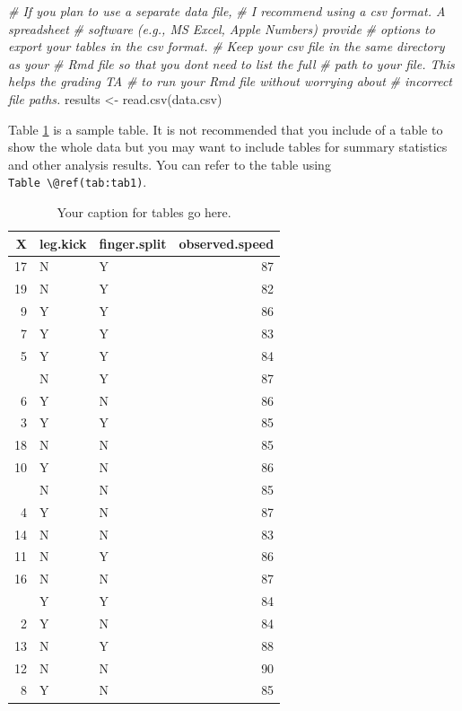 \documentclass[
]{article}
\newenvironment{Shaded}{\begin{snugshade}}{\end{snugshade}}
\newcommand{\CommentTok}[1]{\textcolor[rgb]{0.56,0.35,0.01}{\textit{#1}}}
\newcommand{\FunctionTok}[1]{\textcolor[rgb]{0.00,0.00,0.00}{#1}}
\newcommand{\NormalTok}[1]{#1}
\newcommand{\OtherTok}[1]{\textcolor[rgb]{0.56,0.35,0.01}{#1}}
\newcommand{\StringTok}[1]{\textcolor[rgb]{0.31,0.60,0.02}{#1}}
\begin{document}
\begin{Shaded}
\begin{Highlighting}[]
\CommentTok{\# If you plan to use a separate data file,}
\CommentTok{\# I recommend using a csv format. A spreadsheet}
\CommentTok{\# software (e.g., MS Excel, Apple Numbers) provide}
\CommentTok{\# options to export your tables in the csv format.}
\CommentTok{\# Keep your csv file in the same directory as your}
\CommentTok{\# Rmd file so that you don\textquotesingle{}t need to list the full}
\CommentTok{\# path to your file. This helps the grading TA}
\CommentTok{\# to run your Rmd file without worrying about}
\CommentTok{\# incorrect file paths.}
\NormalTok{results }\OtherTok{\textless{}{-}} \FunctionTok{read.csv}\NormalTok{(}\StringTok{\textquotesingle{}data.csv\textquotesingle{}}\NormalTok{)}
\end{Highlighting}
\end{Shaded}

Table \ref{tab:tab1} is a sample table. It is not recommended that you include of a table to show the whole data but you may want to include tables for summary statistics and other analysis results. You can refer to the table using \texttt{Table\ \textbackslash{}@ref(tab:tab1)}.

\begin{table}

\caption{\label{tab:tab1}Your caption for tables go here.}
\centering
\begin{tabular}[t]{rllr}
\toprule
X & leg.kick & finger.split & observed.speed\\
\midrule
17 & N & Y & 87\\
19 & N & Y & 82\\
9 & Y & Y & 86\\
7 & Y & Y & 83\\
5 & Y & Y & 84\\
\addlinespace
15 & N & Y & 87\\
6 & Y & N & 86\\
3 & Y & Y & 85\\
18 & N & N & 85\\
10 & Y & N & 86\\
\addlinespace
20 & N & N & 85\\
4 & Y & N & 87\\
14 & N & N & 83\\
11 & N & Y & 86\\
16 & N & N & 87\\
\addlinespace
1 & Y & Y & 84\\
2 & Y & N & 84\\
13 & N & Y & 88\\
12 & N & N & 90\\
8 & Y & N & 85\\
\bottomrule
\end{tabular}
\end{table}
\end{document}
